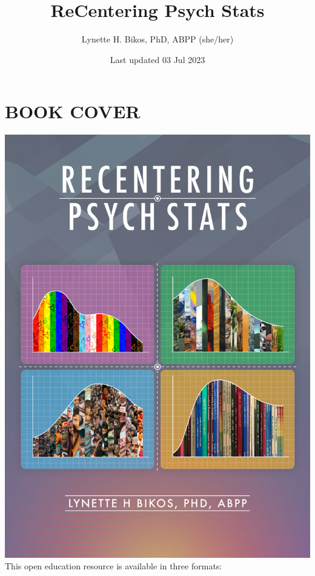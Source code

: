 \documentclass[
  11pt,
]{book}
\title{ReCentering Psych Stats}
\author{Lynette H. Bikos, PhD, ABPP (she/her)}
\date{Last updated 03 Jul 2023}
\begin{document}
\maketitle

{
\hypersetup{linkcolor=}
\setcounter{tocdepth}{3}
\tableofcontents
}
\hypertarget{book-cover}{%
\chapter*{BOOK COVER}\label{book-cover}}


\includegraphics{images/ReCenterPsychStats-bookcover2.jpg} This open education resource is available in three formats:
\end{document}
